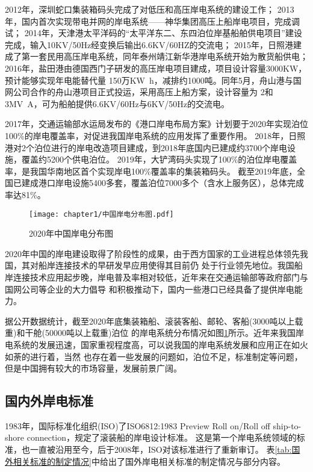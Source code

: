 2012年，深圳蛇口集装箱码头完成了对低压和高压岸电系统的建设工作；
2013年，国内首次实现带电并网的岸电系统——神华集团高压上船岸电项目，完成调试\cite{SP8}；
2014年，天津港太平洋码的“太平洋东二、东四泊位岸基船舶供电项目”建设完成，输入10KV/50Hz经变换后输出6.6KV/60HZ的交流电；
2015年，日照港建成了第一套民用高压岸电系统\cite{SP9}，同年泰州靖江新华港岸电系统开始为散货船供电；
2016年，盐田港由德国西门子研发的高压岸电项目建成，项目设计容量3000KW，预计能够实现年电能替代量
150万\si{KW.h}，减排约1000吨。同年5月，舟山港与国网公司合作的舟山港项目正式投运，采用高压上船方案，设计容量为
2和3\si{MV.A}，可为船舶提供6.6KV/60Hz与6KV/50Hz的交流电\cite{SP10}。

2017年，交通运输部水运局发布的《港口岸电布局方案》计划要于2020年实现泊位100\%的岸电覆盖率，对促进我国岸电系统的应用发挥了重要作用。
2018年，日照港对2个泊位进行的岸电改造项目建成，到2018年底国内已建成约3700个岸电设施，覆盖约5200个供电泊位。
2019年，大铲湾码头实现了100\%的泊位岸电覆盖率，是我国华南地区首个实现岸电100\%覆盖率的集装箱码头\cite{SP11}。
截至2019年底，全国已建成港口岸电设施5400多套，覆盖泊位7000多个（含水上服务区），总体完成率达81\%\cite{SP12}。

\begin{figure}[!htp]
	\centering
	\texttt{[image: chapter1/中国岸电分布图.pdf]}
	\caption{ 2020年中国岸电分布图}
	\label{fig:中国岸电分布图}
\end{figure}

2020年中国的岸电建设取得了阶段性的成果，由于西方国家的工业进程总体领先我国，其对船岸连接技术的早研发早应用使得其目前仍
处于行业领先地位。我国船岸连接技术应用起步晚，岸电普及率相对较低，近年来在交通运输部等政府部门与国网公司等企业的大力倡导
和积极推动下，国内一些港口已经具备了提供岸电能力。

据公开数据统计，截至2020年底集装箱船、滚装客船、邮轮、客船(3000吨以上载重)和干舱(50000吨以上载重)泊位
的岸电系统分布情况如图\ref{fig:中国岸电分布图}所示。近年来我国岸电系统的发展迅速，国家重视程度高，可以说我国的岸电系统发展和应用正在如火如荼的进行着，当然
也存在着一些发展的问题如，泊位不足，标准制定等问题，但是中国拥有较大的市场容量，发展前景广阔。

\subsection{国内外岸电标准}

1983年，国际标准化组织(ISO)了ISO6812:1983 Preview Roll on/Roll off ship-to-shore connection，规定了滚装船的岸电设计标准。
这是第一个岸电系统领域的标准，也一直被沿用至今，后于2008年，ISO对该标准进行了重新审订\cite{SP4}。
表\ref{tab:国外相关标准的制定情况}中给出了国外岸电相关标准的制定情况与部分内容。
\begin{table}[!htp]
	\centering
	\caption[国外相关标准的制定情况]{国外相关标准的制定情况}
	\label{tab:国外相关标准的制定情况}
\end{table}

